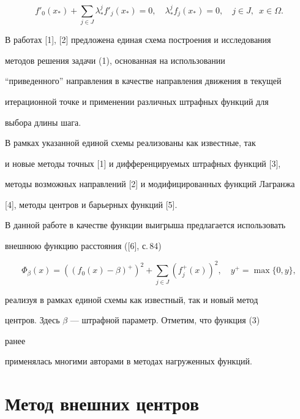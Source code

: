 \begin{equation} 


f'_0(x_*)+\sum_{j\in J}\lambda^j_* f'_j(x_*)=0,\quad 


\lambda^j_* f_j(x_*)=0,\quad j\in J,\ \; x\in\Omega.


\end{equation} 


 


В работах [1], [2] предложена единая схема построения и исследования 


методов решения задачи (1), основанная на использовании 


``приведенного'' направления в качестве направления движения в текущей 


итерационной точке и применении различных штрафных функций для 


выбора длины шага. 


 


В рамках указанной единой схемы реализованы как известные, так 


и новые методы точных [1] и дифференцируемых штрафных функций [3], 


методы возможных направлений [2] и модифицированных функций Лагранжа 


[4], методы центров и барьерных функций [5]. 


 


В данной работе в качестве функции выигрыша предлагается использовать 


внешнюю функцию расстояния ([6], с.\,84) 


\begin{equation} 


\Phi_\beta(x)=((f_0(x)-\beta)^+)^2+\sum_{j\in J} 


(f^+_j(x))^2,\quad y^+=\max\{0,y\}, 


\end{equation} 


реализуя в рамках единой схемы как известный, так и новый метод 


центров. Здесь $\beta$ --- штрафной параметр. Отметим, что функция (3) 


ранее 


применялась многими авторами в методах нагруженных функций. 


 


\section{Метод внешних центров} 


